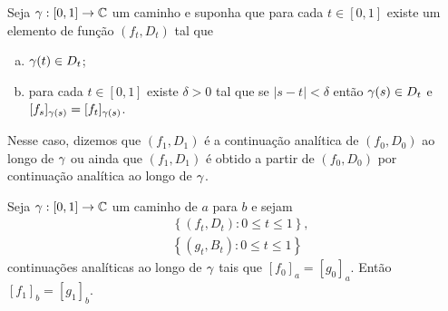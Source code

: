     \begin{definicao}
    \label{def-continuacao-analitica}
        Seja $\gamma: [0,1] \to \mathbb{C}$ um caminho e suponha que para cada
        $t\in[0,1]$ existe um elemento de função $(f_t, D_t)$ tal que
        \begin{enumerate}[(a)]
            \item $\gamma(t) \in D_t$;
            \item para cada $t\in[0,1]$ existe $\delta > 0$ tal que se $|s-t| < \delta$
            então $\gamma(s) \in D_t$ e $[f_s]_{\gamma(s)} = [f_t]_{\gamma(s)}$.
        \end{enumerate}
        Nesse caso, dizemos que $(f_1, D_1)$ é a continuação analítica de $(f_0,D_0)$ ao 
        longo de $\gamma$ ou ainda que $(f_1, D_1)$ é obtido a partir de $(f_0,D_0)$ por
        continuação analítica ao longo de $\gamma$.
    \end{definicao}


    \begin{proposicao}
    \label{prop-unicidade-continuacao-analitica-caminho}
        Seja $\gamma: [0,1]\to\mathbb{C}$ um caminho de $a$ para $b$ e sejam
        \begin{align*}
            &\left\{ (f_t, D_t): 0\leq t\leq 1 \right\}, \\
            &\left\{ (g_t, B_t): 0\leq t\leq 1 \right\}
        \end{align*}
        continuações analíticas ao longo de $\gamma$ tais que $[f_0]_a = [g_0]_a$.
        Então $[f_1]_b = [g_1]_b$.
    \end{proposicao}

